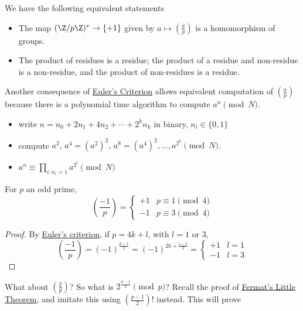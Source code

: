 \documentclass{article}
\newcommand{\legendre}[2]{\genfrac{(}{)}{}{}{#1}{#2}}
\begin{document}
\begin{remark}
    We have the following equivalent statements
    \begin{itemize}
        \item The map $(\Z/ p\Z)^* \to \{+1\}$ given by $a \mapsto \legendre{a}{p}$ is a homomorphism of groups.
        \item The product of residues is a residue; the product of a residue and non-residue is a non-residue, and the product of non-residues is a residue.
    \end{itemize}
\end{remark}

Another consequence of \hyperlink{lem:eulerCriterion}{Euler's Criterion} allows equivalent computation of $\legendre{a}{p}$ because there is a polynomial time algorithm to compute $a^n \pmod{N}$.
\begin{itemize}
    \item write $n = n_0 + 2 n_1 + 4 n_2 + \dotsb + 2^k n_k$ in binary, $n_i \in \{0, 1\}$
    \item compute $a^2, \, a^4 = (a^2)^2, \, a^8 = (a^4)^2, \dotsc, a^{2^k} \pmod{N}$.
    \item $a^n \equiv \prod_{i: n_i = 1} a^{2^i} \pmod{N}$
\end{itemize}

\begin{ncor}\label{cor:3.3}
    For $p$ an odd prime,
    \begin{equation*}
        \legendre{-1}{p} =
        \begin{cases}
            +1 & p \equiv 1 \pmod{4} \\
            -1 & p \equiv 3 \pmod{4}
        \end{cases}
    \end{equation*}
\end{ncor}

\begin{proof}
    By \hyperlink{lem:eulerCriterion}{Euler's criterion}, if $p = 4k + l$, with $l = 1 $ or $3$,
    \begin{equation*}
        \legendre{-1}{p} = (-1)^{\frac{p-1}{2}} = (-1)^{2k + \frac{l-1}{2}} =
        \begin{cases}
            +1 & l = 1 \\
            -1 & l = 3
        \end{cases}
    \end{equation*}
\end{proof}

What about $\legendre{2}{p}$? So what is $2^{\frac{p-1}{2}} \pmod{p}$?
Recall the proof of \hyperlink{thm:fermatLittle}{Fermat's Little Theorem}, and imitate this using $\left(\frac{p-1}{2}\right)!$ instead.
This will prove
\end{document}

